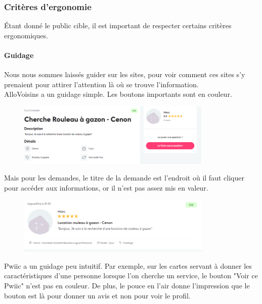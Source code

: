 \documentclass[a4paper,11pt]{article}
\begin{document}
\pagebreak

\subsubsection{Critères d'ergonomie}

Étant donné le public cible, il est important de respecter certains critères ergonomiques.\\

\paragraph{Guidage}

Nous nous sommes laissés guider sur les sites, pour voir comment ces sites s’y prenaient pour attirer
l’attention là où se trouve l’information.\\

AlloVoisins a un guidage simple. Les boutons importants sont en couleur.\\

\begin{figure}[H]
  \includegraphics[width=350px]{images/Guidage-allovoisins.png}
  \label{fig:Guidage-allovoisins}
\end{figure}

Mais pour les demandes, le titre de la demande est l’endroit où il faut cliquer pour accéder aux informations,
or il n’est pas assez mis en valeur.\\

\begin{figure}[H]
  \includegraphics[width=350px]{images/demande-allovoisins.png}
  \label{fig:demande-allovoisins}
\end{figure}

Pwiic a un guidage peu intuitif. Par exemple, sur les cartes servant à donner les caractéristiques d’une personne
lorsque l’on cherche un service, le bouton "Voir ce Pwiic" n’est pas en couleur. De plus, le pouce en l’air donne
l’impression que le bouton est là pour donner un avis et non pour voir le profil.\\
\end{document}
